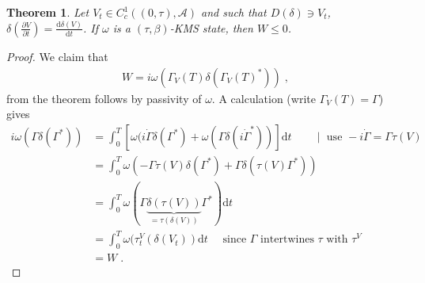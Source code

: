 \documentclass[
a4paper, %
11pt, %
onecolumn, %
openany, %
]{memoir}
\theoremstyle{definition}
\theoremstyle{remark}
\theoremstyle{plain}
\newtheorem{theorem}[definition]{Theorem}
\begin{document}
\begin{theorem}
Let $V_t\in C_c^1((0,\tau),\mathcal{A})$ and such that $D(\delta)\ni V_t$, $\delta\left(\frac{\partial V}{\partial t}\right)=\frac{\mathrm{d}\delta(V)}{\mathrm{d}t}$. If $\omega$ is a $(\tau,\beta)$-KMS state, then $W\leq 0$.\end{theorem} \begin{proof}
We claim that \begin{align}
W=i\omega(\Gamma_V(T)\delta(\Gamma_V(T)^*))\; ,
\end{align}
from the theorem follows by passivity of $\omega$. A calculation (write $\Gamma_V(T)=\Gamma$) gives \begin{align}
i\omega(\Gamma\delta(\Gamma^*))&=\int_0^T[\omega(i\dot{\Gamma}\delta(\Gamma^*)+\omega(\Gamma\delta(i\dot{\Gamma}^*))]\mathrm{d}t \qquad \mid \text{ use } -i\dot{\Gamma}=\Gamma\tau(V)\\
&=\int_0^T \omega(-\Gamma\tau(V)\delta(\Gamma^*)+\Gamma\delta(\tau(V)\Gamma^*))\\
&= \int_0^T\omega(\Gamma\underbrace{\delta(\tau(V))}_{=\tau(\delta(V))}\Gamma^*)\mathrm{d}t\\
&=\int_0^T\omega(\tau_t^V(\delta(V_t))\mathrm{d}t\quad \text{ since } \Gamma \text{ intertwines } \tau \text{ with } \tau^V\\
&=W\;.
\end{align}
\end{proof}
\end{document}

